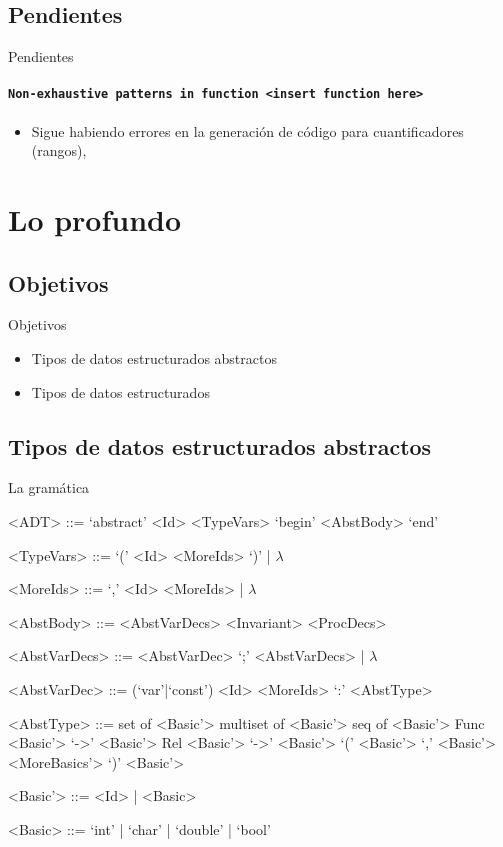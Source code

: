 \documentclass{beamer}
\begin{document}
\subsection{Pendientes}
\begin{frame}{Pendientes}
\framesubtitle{\texttt{Non-exhaustive patterns in function <insert function here>}}
\begin{itemize}
  \item Sigue habiendo errores en la generación de código para cuantificadores (rangos),
\end{itemize}
\end{frame}


\section{Lo profundo}
\subsection{Objetivos}
\begin{frame}{Objetivos}
\begin{itemize}
  \item Tipos de datos estructurados abstractos
  \item Tipos de datos estructurados
\end{itemize}
\end{frame}


\subsection{Tipos de datos estructurados abstractos}
\begin{frame}[fragile]{La gramática}
\scriptsize
\begin{grammar}

<ADT> ::= `abstract' <Id> <TypeVars> `begin' <AbstBody> `end'

<TypeVars> ::= `(' <Id> <MoreIds> `)' | $\lambda$

<MoreIds> ::= `,' <Id> <MoreIds> | $\lambda$

<AbstBody> ::= <AbstVarDecs> <Invariant> <ProcDecs>

<AbstVarDecs> ::= <AbstVarDec> `;' <AbstVarDecs> | $\lambda$

<AbstVarDec> ::= (`var'|`const') <Id> <MoreIds> `:' <AbstType>

<AbstType> ::= set of <Basic'>
\alt multiset of <Basic'>
\alt seq of <Basic'>
\alt Func <Basic'> `->' <Basic'>
\alt Rel <Basic'> `->' <Basic'>
\alt `(' <Basic'> `,' <Basic'> <MoreBasics'> `)'
\alt <Basic'>

<Basic'> ::= <Id> | <Basic>

<Basic> ::= `int' | `char' | `double' | `bool'

\end{grammar}
\end{frame}
\end{document}
